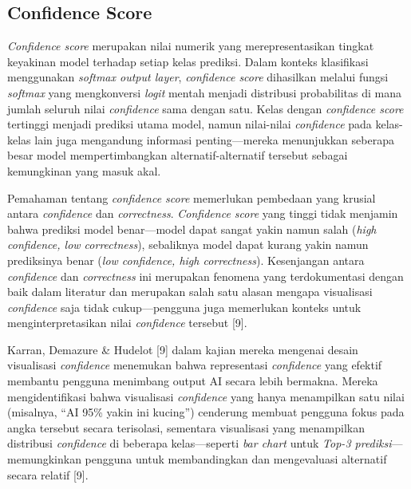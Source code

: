\subsection{Confidence Score}
\label{subsec:confidence-score}

\textit{Confidence score} merupakan nilai numerik yang merepresentasikan tingkat keyakinan model terhadap setiap kelas prediksi. Dalam konteks klasifikasi menggunakan \textit{softmax output layer}, \textit{confidence score} dihasilkan melalui fungsi \textit{softmax} yang mengkonversi \textit{logit} mentah menjadi distribusi probabilitas di mana jumlah seluruh nilai \textit{confidence} sama dengan satu. Kelas dengan \textit{confidence score} tertinggi menjadi prediksi utama model, namun nilai-nilai \textit{confidence} pada kelas-kelas lain juga mengandung informasi penting—mereka menunjukkan seberapa besar model mempertimbangkan alternatif-alternatif tersebut sebagai kemungkinan yang masuk akal.

Pemahaman tentang \textit{confidence score} memerlukan pembedaan yang krusial antara \textit{confidence} dan \textit{correctness}. \textit{Confidence score} yang tinggi tidak menjamin bahwa prediksi model benar—model dapat sangat yakin namun salah (\textit{high confidence, low correctness}), sebaliknya model dapat kurang yakin namun prediksinya benar (\textit{low confidence, high correctness}). Kesenjangan antara \textit{confidence} dan \textit{correctness} ini merupakan fenomena yang terdokumentasi dengan baik dalam literatur dan merupakan salah satu alasan mengapa visualisasi \textit{confidence} saja tidak cukup—pengguna juga memerlukan konteks untuk menginterpretasikan nilai \textit{confidence} tersebut [9].

Karran, Demazure \& Hudelot [9] dalam kajian mereka mengenai desain visualisasi \textit{confidence} menemukan bahwa representasi \textit{confidence} yang efektif membantu pengguna menimbang output AI secara lebih bermakna. Mereka mengidentifikasi bahwa visualisasi \textit{confidence} yang hanya menampilkan satu nilai (misalnya, ``AI 95\% yakin ini kucing'') cenderung membuat pengguna fokus pada angka tersebut secara terisolasi, sementara visualisasi yang menampilkan distribusi \textit{confidence} di beberapa kelas—seperti \textit{bar chart} untuk \textit{Top-3 prediksi}—memungkinkan pengguna untuk membandingkan dan mengevaluasi alternatif secara relatif [9].

